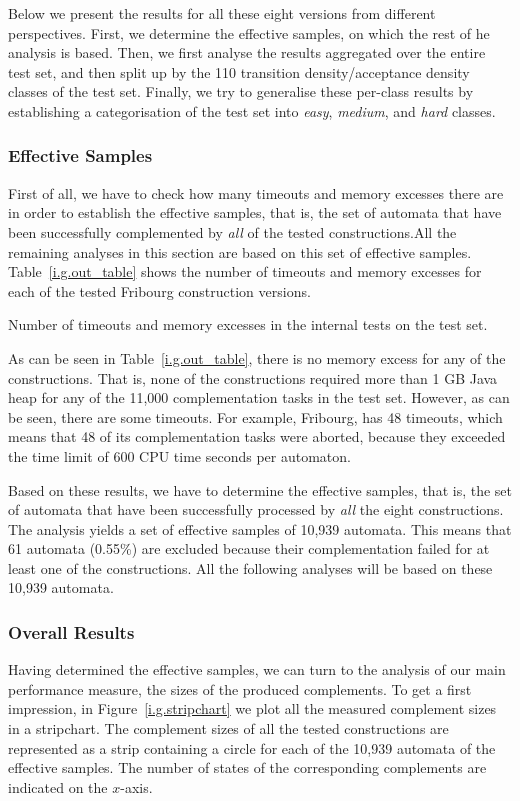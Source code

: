 Below we present the results for all these eight versions from different perspectives. First, we determine the effective samples, on which the rest of he analysis is based. Then, we first analyse the results aggregated over the entire test set, and then split up by the 110 transition density/acceptance density classes of the \goal{} test set. Finally, we try to generalise these per-class results by establishing a categorisation of the \goal{} test set into \textit{easy}, \textit{medium}, and \textit{hard} classes.

\subsubsection{Effective Samples}
First of all, we have to check how many timeouts and memory excesses there are in order to establish the effective samples, that is, the set of automata that have been successfully complemented by \textit{all} of the tested constructions.All the remaining analyses in this section are based on this set of effective samples. Table~\ref{i.g.out_table} shows the number of timeouts and memory excesses for each of the tested Fribourg construction versions.

\begin{table}[ht]
\centering

\caption{Number of timeouts and memory excesses in the internal tests on the \goal{} test set.}
\label{i.g.out_table}
\end{table}

As can be seen in Table~\ref{i.g.out_table}, there is no memory excess for any of the constructions. That is, none of the constructions required more than 1 GB Java heap for any of the 11,000 complementation tasks in the \goal{} test set. However, as can be seen, there are some timeouts. For example, Fribourg, has 48 timeouts, which means that 48 of its complementation tasks were aborted, because they exceeded the time limit of 600 CPU time seconds per automaton.

Based on these results, we have to determine the effective samples, that is, the set of automata that have been successfully processed by \textit{all} the eight constructions. The analysis yields a set of effective samples of 10,939 automata. This means that 61 automata (0.55\%) are excluded because their complementation failed for at least one of the constructions. All the following analyses will be based on these 10,939 automata.

\subsubsection{Overall Results}
Having determined the effective samples, we can turn to the analysis of our main performance measure, the sizes of the produced complements. To get a first impression, in Figure~\ref{i.g.stripchart} we plot all the measured complement sizes in a stripchart. The complement sizes of all the tested constructions are represented as a strip containing a circle for each of the 10,939 automata of the effective samples. The number of states of the corresponding complements are indicated on the $x$-axis.

